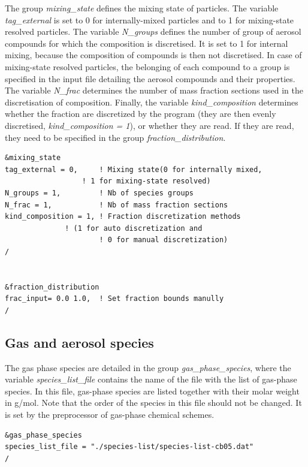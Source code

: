 \documentclass[a4paper,11pt]{article}
\begin{document}
The group {\textit{mixing\_state}} defines the mixing state of particles. The variable {\textit{tag\_external}} is set to 0 for internally-mixed particles and to 1 for mixing-state resolved particles. The variable {\textit{N\_groups}} defines the number of group of aerosol compounds for which the composition is discretised. It is set to 1 for internal mixing, because the composition of compounds is then not discretised. In case of mixing-state resolved particles, the belonging of each compound to a group is specified in the input file detailing the aerosol compounds and their properties.
The variable {\textit{N\_frac}} determines the number of mass fraction sections used in the discretisation of composition. 
Finally, the variable {\textit{kind\_composition}} determines whether the fraction are discretized by the program (they are then evenly discretised, {\textit{kind\_composition = 1}}), or whether they are read. If they are read, they need to be specified in the group {\textit{fraction\_distribution}}.


\begin{verbatim}
&mixing_state
tag_external = 0,     ! Mixing state(0 for internally mixed, 
	              ! 1 for mixing-state resolved) 
N_groups = 1,         ! Nb of species groups
N_frac = 1, 	      ! Nb of mass fraction sections
kind_composition = 1, ! Fraction discretization methods 
		      ! (1 for auto discretization and 
                      ! 0 for manual discretization)
/


&fraction_distribution
frac_input= 0.0 1.0,  ! Set fraction bounds manully
/

\end{verbatim}

\subsection{Gas and aerosol species}

The gas phase species are detailed in the group {\textit{gas\_phase\_species}}, where the variable {\textit{species\_list\_file}} contains the name of the file with the list of gas-phase species.
In this file, gas-phase species are listed together with their molar weight in g/mol. Note that the order of the species in this file should not be changed. It is set by the preprocessor of gas-phase chemical schemes.


\begin{verbatim}
&gas_phase_species
species_list_file = "./species-list/species-list-cb05.dat"   
/
\end{verbatim}
\end{document}
